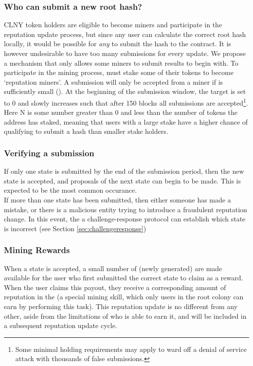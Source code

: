\subsubsection*{Who can submit a new root hash?}
CLNY token holders are eligible to become miners and participate in the reputation update process, but since any user can calculate the correct root hash locally, it would be possible for \emph{any} \rcth to submit the hash to the contract.
It is however undesirable to have too many submissions for every update. We propose a mechanism that only allows some miners to submit results to begin with. To participate in the mining process, \rcths must stake some of their tokens to become `reputation miners'. A submission will only be accepted from a miner if  is sufficiently small ().  At the beginning of the submission window, the target is set to 0 and slowly increases such that after 150 blocks all submissions are accepted\footnote{Some minimal \rct holding requirements may apply to ward off a denial of service attack with thousands of false submissions.}. Here N is some number greater than 0 and less than the number of tokens the \rcth address has staked, meaning that users with a large stake have a higher chance of qualifying to submit a hash than smaller stake holders.
%
\subsubsection*{Verifying a submission}
If only one state is submitted by the end of the submission period, then the new state is accepted, and proposals of the next state can begin to be made. This is expected to be the most common occurance.\\
If more than one state has been submitted, then either someone has made a mistake, or there is a malicious entity trying to introduce a fraudulent reputation change. In this event, the a challenge-response protocol can establish which state is incorrect (see Section \ref{sec:challengeresponse})

\subsubsection*{Mining Rewards}

When a state is accepted, a small number of (newly generated) \rcts are made available for the user who first submitted the correct state to claim as a reward. When the user claims this payout, they receive a corresponding amount of reputation in the \rc (a special mining skill, which only users in the root colony can earn by performing this task). This reputation update is no different from any other, aside from the limitations of who is able to earn it, and will be included in a subsequent reputation update cycle.

